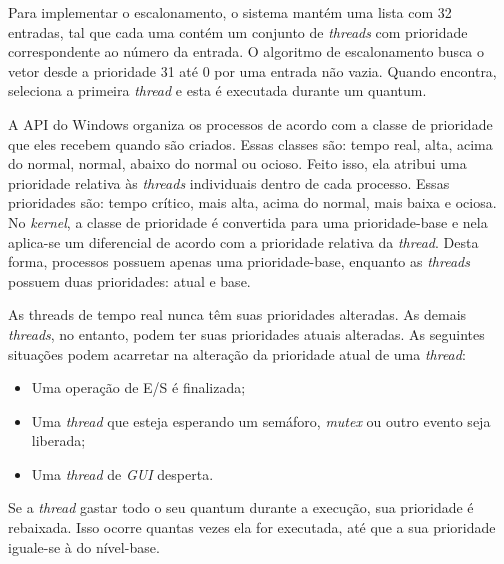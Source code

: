 Para implementar o escalonamento, o sistema mantém uma lista com 32 entradas, tal que cada uma contém um conjunto de \emph{threads} com prioridade correspondente ao número da entrada. O algoritmo de escalonamento busca o vetor desde a prioridade 31 até 0 por uma entrada não vazia. Quando encontra, seleciona a primeira \emph{thread} e esta é executada durante um quantum. 

A API do Windows organiza os processos de acordo com a classe de prioridade que eles recebem quando são criados. Essas classes são: tempo real, alta, acima do normal, normal, abaixo do normal ou ocioso. Feito isso, ela atribui uma prioridade relativa às \emph{threads} individuais dentro de cada processo. Essas prioridades são: tempo crítico, mais alta, acima do normal, mais baixa e ociosa. No \emph{kernel}, a classe de prioridade é convertida para uma prioridade-base e nela aplica-se um diferencial de acordo com a prioridade relativa da \emph{thread}. Desta forma, processos possuem apenas uma prioridade-base, enquanto as \emph{threads} possuem duas prioridades: atual e base. 

As threads de tempo real nunca têm suas prioridades alteradas. As demais \emph{threads}, no entanto, podem ter suas prioridades atuais alteradas. As seguintes situações podem acarretar na alteração da prioridade atual de uma \emph{thread}:
\begin{itemize}
	\item Uma operação de E/S é finalizada;
	\item Uma \emph{thread} que esteja esperando um semáforo, \emph{mutex} ou outro evento seja liberada;
	\item Uma \emph{thread} de \emph{GUI} desperta.
\end{itemize}

Se a \emph{thread} gastar todo o seu quantum durante a execução, sua prioridade é rebaixada. Isso ocorre quantas vezes ela for executada, até que a sua prioridade iguale-se à do nível-base.

